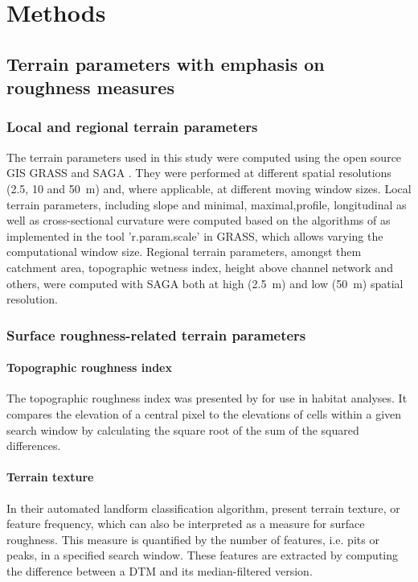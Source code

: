 \documentclass[preprint,12pt,authoryear]{elsarticle}
\begin{document}
\section{Methods}

\subsection{Terrain parameters with emphasis on roughness measures}
\subsubsection{Local and regional terrain parameters}
The terrain parameters used in this study were computed using the open source GIS GRASS \citep{GRASS} and SAGA \citep{SAGA}. They were performed at different spatial resolutions (2.5, 10 and 50~m) and, where applicable, at different moving window sizes. Local terrain parameters, including slope and minimal, maximal,profile, longitudinal as well as cross-sectional curvature were computed based on the algorithms of \cite{Wood1996} as implemented in the tool 'r.param.scale' in GRASS, which allows varying the computational window size. Regional terrain parameters, amongst them catchment area, topographic wetness index, height above channel network and others, were computed with SAGA both at high (2.5~m) and low (50~m) spatial resolution.  
\subsubsection{Surface roughness-related terrain parameters}
\paragraph{Topographic roughness index} 
The topographic roughness index was presented by  \cite{Riley1999} for use in habitat analyses. It  compares the elevation of a central pixel to the elevations of cells within a given search window by calculating the square root of the sum of the squared differences.

\paragraph{Terrain texture}
In their automated landform classification algorithm, \cite{Iwahashi2007} present terrain texture, or feature frequency, which can also be interpreted as a measure for surface roughness. This measure is quantified by the number of features, i.e. pits or peaks, in a specified search window. These features are  extracted by computing the difference between a DTM and its median-filtered version.
\end{document}
